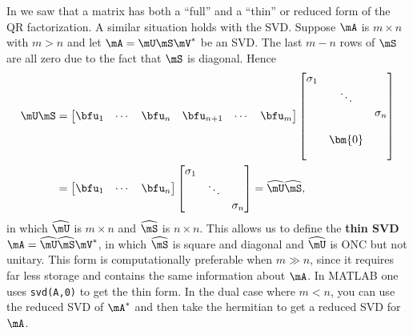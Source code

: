 In  we saw that a matrix has both a ``full'' and a ``thin'' or reduced form of the QR factorization.  A similar situation holds with the SVD. Suppose $\mA$ is $m\times n$ with $m > n$ and let $\mA=\mU\mS\mV^*$ be an SVD. The last $m-n$ rows of $\mS$ are all zero due to the fact that $\mS$ is diagonal. Hence
\begin{align}
  \mU \mS & =
  \begin{bmatrix}
    \bfu_1 & \cdots & \bfu_n & \bfu_{n+1} & \cdots & \bfu_m
  \end{bmatrix}
  \begin{bmatrix}
    \sigma_1 & &  \\
    & \ddots &  \\
    & & \sigma_n \\
    & & \\
    & \bm{0} & \\
    & &
  \end{bmatrix} \notag\\
  &=
  \begin{bmatrix}
    \bfu_1 & \cdots & \bfu_n
  \end{bmatrix}
  \begin{bmatrix}
    \sigma_1 & &  \\
    & \ddots &  \\
    & & \sigma_n
  \end{bmatrix} = \widehat{\mU} \widehat{\mS},
        \label{eq:svd-reduced}
\end{align}
in which $\widehat{\mU}$ is $m\times n$ and $\widehat{\mS}$ is $n\times n$. This allows us to define the \textbf{thin SVD} $\mA=\widehat{\mU}\widehat{\mS}\mV^*$, in which $\widehat{\mS}$ is square and diagonal and $\widehat{\mU}$ is  ONC but not unitary. This form is computationally preferable when $m\gg n$, since it requires far less storage and contains the same information about $\mA$. In MATLAB one uses \verb|svd(A,0)| to get the thin form. In the dual case where $m<n$, you can use the reduced SVD of $\mA^*$ and then take the hermitian to get a reduced SVD for $\mA$.


\begin{exercises}
	
\end{exercises}






